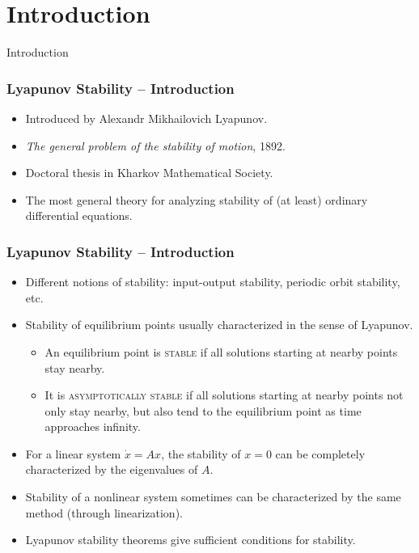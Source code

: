 \section{Introduction}

\begin{frame}
    Introduction


\end{frame}

\begin{frame}
    \frametitle{Lyapunov Stability -- Introduction}

    

    \begin{itemize}
        \item Introduced by Alexandr Mikhailovich Lyapunov.
        \item \textit{The general problem of the stability of motion}, 1892.
        \item Doctoral thesis in Kharkov Mathematical Society.
        \item The most general theory for analyzing stability of (at least)
        ordinary differential equations.
    \end{itemize}

\end{frame}


\begin{frame}
    \frametitle{Lyapunov Stability -- Introduction}

    \begin{itemize}
        \item Different notions of stability: input-output stability, periodic
        orbit stability, etc. 
        \item Stability of equilibrium points usually characterized in the sense 
        of Lyapunov.
        \begin{itemize}
            \item An equilibrium point is \textsc{stable} if all solutions
            starting at nearby points stay nearby.
            \item It is \textsc{asymptotically stable} if all solutions starting
            at nearby points not only stay nearby, but also tend to the
            equilibrium point as time approaches infinity.
        \end{itemize}
        \item For a linear system $\dot{x} = Ax$, the stability of $x=0$ can be
        completely characterized by the eigenvalues of $A$.
        \item Stability of a nonlinear system sometimes can be characterized by
        the same method (through linearization).
        \item Lyapunov stability theorems give sufficient conditions for
        stability.
    \end{itemize}
\end{frame}